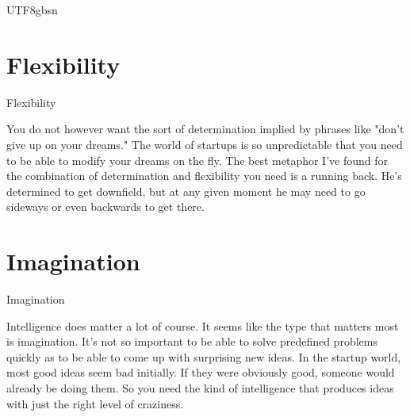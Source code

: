 \documentclass{beamer}
\begin{document}
\begin{CJK}{UTF8}{gbsn}
\section{Flexibility}
\begin{frame}{Flexibility}
  \begin{block}{You do not however want the sort of determination implied by phrases like "don't give up on your dreams." The world of startups is so unpredictable that you need to be able to modify your dreams on the fly. The best metaphor I've found for the combination of determination and flexibility you need is a running back. He's determined to get downfield, but at any given moment he may need to go sideways or even backwards to get there.}    
  \end{block}
\end{frame}
\section{Imagination}
\begin{frame}{Imagination}
  \begin{block}{Intelligence does matter a lot of course. It seems like the type that matters most is imagination. It's not so important to be able to solve predefined problems quickly as to be able to come up with surprising new ideas. In the startup world, most good ideas seem bad initially. If they were obviously good, someone would already be doing them. So you need the kind of intelligence that produces ideas with just the right level of craziness.}
  \end{block}
\end{frame}

\end{CJK}
\end{document}
